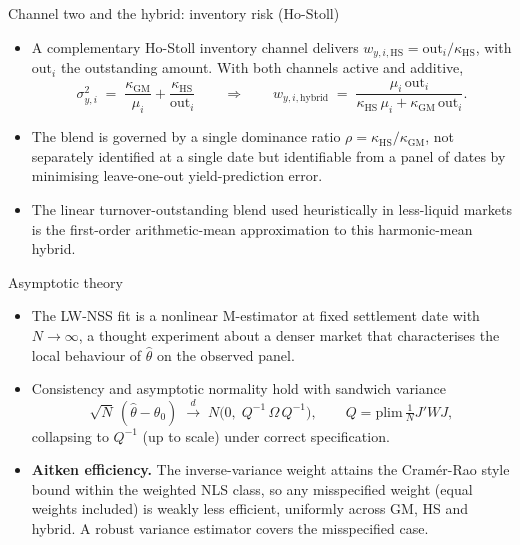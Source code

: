 \documentclass[aspectratio=169,11pt]{beamer}
\newcommand{\GM}{\mathrm{GM}}
\newcommand{\HS}{\mathrm{HS}}
\newcommand{\out}{\mathrm{out}}
\begin{document}
\begin{frame}{Channel two and the hybrid: inventory risk (Ho-Stoll)}
  \begin{itemize}
    \item A complementary Ho-Stoll inventory channel delivers
          $w_{y,i,\HS} = \out_i/\kappa_{\HS}$, with $\out_i$ the outstanding
          amount. With both channels active and additive,
          \[ \sigma_{y,i}^2 \;=\; \frac{\kappa_{\GM}}{\mu_i}
             + \frac{\kappa_{\HS}}{\out_i}
             \qquad\Longrightarrow\qquad
             w_{y,i,\mathrm{hybrid}}
             \;=\; \frac{\mu_i\,\out_i}{\kappa_{\HS}\,\mu_i + \kappa_{\GM}\,\out_i}. \]
    \item The blend is governed by a single dominance ratio
          $\rho = \kappa_{\HS}/\kappa_{\GM}$, not separately identified at a
          single date but identifiable from a panel of dates by minimising
          leave-one-out yield-prediction error.
    \item The linear turnover-outstanding blend used heuristically in
          less-liquid markets is the first-order arithmetic-mean
          approximation to this harmonic-mean hybrid.
  \end{itemize}
\end{frame}

\begin{frame}{Asymptotic theory}
  \begin{itemize}
    \item The LW-NSS fit is a nonlinear M-estimator at fixed settlement date
          with $N\to\infty$, a thought experiment about a denser market that
          characterises the local behaviour of $\hat\theta$ on the observed
          panel.
    \item Consistency and asymptotic normality hold with sandwich variance
          \[ \sqrt{N}\,(\hat\theta - \theta_0)
             \;\xrightarrow{d}\;
             N\!\big(0,\; Q^{-1}\,\Omega\, Q^{-1}\big),
             \qquad Q = \mathrm{plim}\,\tfrac{1}{N} J' W J, \]
          collapsing to $Q^{-1}$ (up to scale) under correct specification.
    \item \textbf{Aitken efficiency.} The inverse-variance weight attains the
          Cram\'er-Rao style bound within the weighted NLS class, so any
          misspecified weight (equal weights included) is weakly less
          efficient, uniformly across GM, HS and hybrid. A robust variance
          estimator covers the misspecified case.
  \end{itemize}
\end{frame}
\end{document}

